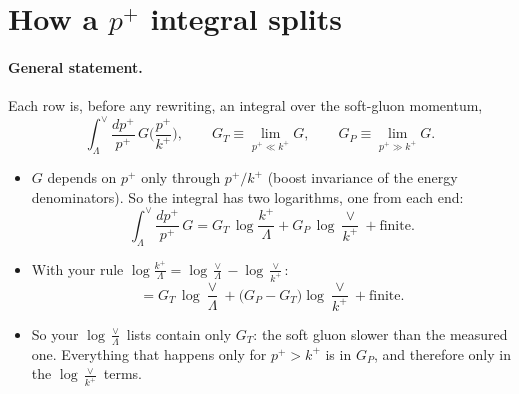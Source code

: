 \documentclass[11pt]{article}
\numberwithin{equation}{section}
\begin{document}
\section{How a \texorpdfstring{$p^+$}{p+} integral splits}\label{sec:mech}
\paragraph{General statement.} Each row is, before any rewriting, an integral over the soft-gluon momentum,
\begin{equation}
\int_\Lambda^\vee\frac{dp^+}{p^+}\,G\Big(\frac{p^+}{k^+}\Big),\qquad G_T\equiv\lim_{p^+\ll k^+}G,\qquad G_P\equiv\lim_{p^+\gg k^+}G .
\end{equation}
\begin{itemize}
\item $G$ depends on $p^+$ only through $p^+/k^+$ (boost invariance of the energy denominators). So the integral has two logarithms, one from each end:
\begin{equation}
\int_\Lambda^\vee\frac{dp^+}{p^+}\,G=G_T\,\log\frac{k^+}{\Lambda}+G_P\,\log\frac{\vee}{k^+}+\text{finite}.
\label{eq:split}
\end{equation}
\item With your rule $\log\frac{k^+}{\Lambda}=\log\frac\vee\Lambda-\log\frac{\vee}{k^+}$:
\begin{equation}
=G_T\,\log\frac{\vee}{\Lambda}+\big(G_P-G_T\big)\log\frac{\vee}{k^+}+\text{finite}.
\label{eq:ruleA}
\end{equation}
\item So your $\log\frac\vee\Lambda$ lists contain only $G_T$: the soft gluon slower than the measured one. Everything that happens only for $p^+>k^+$ is in $G_P$, and therefore only in the $\log\frac{\vee}{k^+}$ terms.
\end{itemize}
\end{document}
